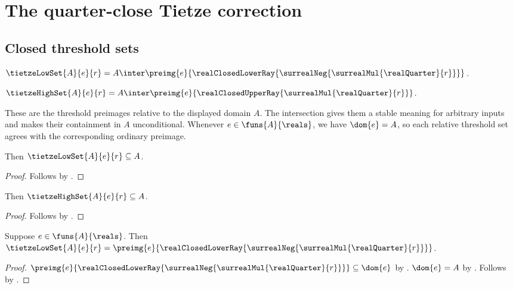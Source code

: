 




\section{The quarter-close Tietze correction}

\subsection{Closed threshold sets}

\begin{definition}\label{tietze_low_set}
    $\tietzeLowSet{A}{e}{r}
        =A\inter\preimg{e}{\realClosedLowerRay{
            \surrealNeg{\surrealMul{\realQuarter}{r}}}}$.
\end{definition}

\begin{definition}\label{tietze_high_set}
    $\tietzeHighSet{A}{e}{r}
        =A\inter\preimg{e}{\realClosedUpperRay{
            \surrealMul{\realQuarter}{r}}}$.
\end{definition}

These are the threshold preimages relative to the displayed domain $A$.
The intersection gives them a stable meaning for arbitrary inputs and makes
their containment in $A$ unconditional.  Whenever
$e\in\funs{A}{\reals}$, we have $\dom{e}=A$, so each relative threshold set
agrees with the corresponding ordinary preimage.

\begin{proposition}\label{tietze_low_set_subset}
    Then $\tietzeLowSet{A}{e}{r}\subseteq A$.
\end{proposition}
\begin{proof}
    Follows by .
\end{proof}

\begin{proposition}\label{tietze_high_set_subset}
    Then $\tietzeHighSet{A}{e}{r}\subseteq A$.
\end{proposition}
\begin{proof}
    Follows by .
\end{proof}

\begin{proposition}\label{tietze_low_set_eq_preimage}
    Suppose $e\in\funs{A}{\reals}$.
    Then $\tietzeLowSet{A}{e}{r}
        =\preimg{e}{\realClosedLowerRay{
            \surrealNeg{\surrealMul{\realQuarter}{r}}}}$.
\end{proposition}
\begin{proof}
    $\preimg{e}{\realClosedLowerRay{
        \surrealNeg{\surrealMul{\realQuarter}{r}}}}\subseteq\dom{e}$
        by .
    $\dom{e}=A$ by .
    Follows by
        .
\end{proof}

